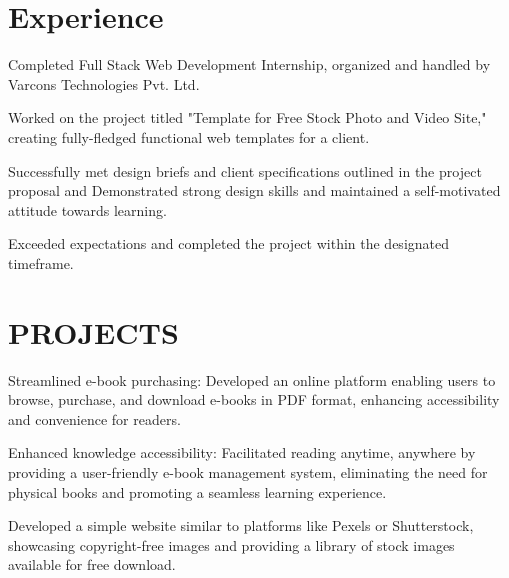 \documentclass[]{deedy-resume-openfont}
\begin{document}
\hfill
\begin{minipage}[t]{0.66\textwidth} 


\vspace{10pt} %

\section{Experience}
\sectionsep


\vspace{\topsep} %
\begin{tightemize}
\item Completed Full Stack Web Development Internship, organized and handled by Varcons Technologies Pvt. Ltd.
\item Worked on the project titled "Template for Free Stock Photo and Video Site," creating fully-fledged functional web templates for a client.
\item Successfully met design briefs and client specifications outlined in the project proposal and Demonstrated strong design skills and maintained a self-motivated attitude towards learning.
\item Exceeded expectations and completed the project within the designated timeframe.
\end{tightemize}
\sectionsep







\section{PROJECTS}


\begin{tightemize}
\item Streamlined e-book purchasing: Developed an online platform enabling users to browse, purchase, and download e-books in PDF format, enhancing accessibility and convenience for readers.
\item Enhanced knowledge accessibility: Facilitated reading anytime, anywhere by providing a user-friendly e-book management system, eliminating the need for physical books and promoting a seamless learning experience.
\end{tightemize}
\begin{tightemize}
\item Developed a simple website similar to platforms like Pexels or Shutterstock, showcasing copyright-free images and providing a library of stock images available for free download.


\end{tightemize}
\end{minipage}
\end{document}
